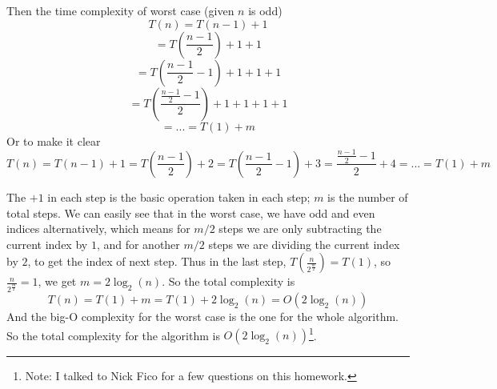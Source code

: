 \begin{itemize}
\begin{itemize}
\end{itemize}

Then the time complexity of worst case (given $n$ is odd) 
\[T(n) = T(n-1) + 1 \]
\[= T(\frac{n-1}{2}) + 1 + 1 \]
\[= T(\frac{n-1}{2}-1) + 1 + 1 + 1\] 
\[= T(\frac{\frac{n-1}{2}-1}{2}) + 1 + 1 + 1 + 1 \]
\[= ... = T(1) + m \] 
Or to make it clear
\[T(n) = T(n-1) + 1 = T(\frac{n-1}{2}) + 2 = T(\frac{n-1}{2}-1) + 3 = \frac{\frac{n-1}{2}-1}{2} + 4 = ... = T(1) + m 
\]

The $+1$ in each step is the basic operation taken in each step; $m$ is the number of total steps. We can easily see that in the worst case, we have odd and even indices alternatively, which means for $m/2$ steps we are only subtracting the current index by $1$, and for another $m/2$ steps we are dividing the current index by $2$, to get the index of next step. Thus in the last step, $T(\frac{n}{2^{\frac{m}{2}}}) = T(1)$, so $\frac{n}{2^{\frac{m}{2}}} = 1$, we get $m = 2\log_2(n)$. So the total complexity is 
\[
T(n) = T(1) + m = T(1) + 2\log_2(n) = O(2\log_2(n))
\]
And the big-O complexity for the worst case is the one for the whole algorithm. So the total complexity for the algorithm is $O(2\log_2(n))$\footnote{Note: I talked to Nick Fico for a few questions on this homework. }.

\end{itemize}


